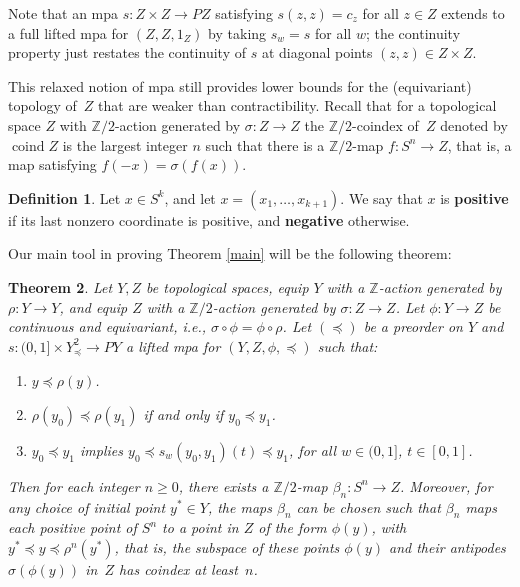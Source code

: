 \documentclass[11pt, reqno, english]{amsart}
\theoremstyle{plain}
\newtheorem{theorem}{Theorem}[section]
\theoremstyle{definition}
\newtheorem{definition}[theorem]{Definition}
\newcommand{\Z}{\mathbb{Z}}
\DeclareMathOperator{\coind}{\mathrm{coind}}
\begin{document}
Note that an mpa $s\colon Z \times Z \rightarrow PZ$ satisfying $s(z, z) =
c_{z}$ for all $z \in Z$ extends to a full lifted mpa for $(Z, Z, 1_{Z})$ by
taking $s_{w} = s$ for all $w$; the continuity property just restates the
continuity of $s$ at diagonal points $(z, z) \in Z \times Z$.

This relaxed notion of mpa still provides lower bounds for the (equivariant)
topology of~$Z$ that are weaker than contractibility. Recall that for a topological
space $Z$ with $\Z/2$-action generated by $\sigma \colon Z \to Z$ the 
$\Z/2$-coindex of~$Z$ denoted by $\coind Z$ is the largest integer $n$ such that
there is a $\Z/2$-map $f\colon S^n \to Z$, that is, a map satisfying $f(-x) = \sigma(f(x))$.

\begin{definition}
  Let $x \in S^{k}$, and let $x = (x_{1}, \ldots , x_{k+1})$. We say that $x$
  is \textbf{positive} if its last nonzero coordinate is positive, and
  \textbf{negative} otherwise.
\end{definition}

Our main tool in proving Theorem \ref{main} will be the following theorem: 

\begin{theorem}\label{mpa}
  Let $Y, Z$ be topological spaces, equip $Y$ with a $\Z$-action generated by
  $\rho\colon Y \rightarrow Y$, and equip $Z$ with a $\Z/2$-action generated
  by $\sigma\colon Z \rightarrow Z$. Let $\phi\colon Y \rightarrow Z$ be
  continuous  
  and equivariant, i.e., $\sigma\circ\phi =  \phi\circ\rho$.
  Let $(\preceq)$ be a preorder on $Y$ and $s\colon
  (0, 1] \times Y^{2}_{\preceq} \rightarrow PY$ a lifted mpa for $(Y, Z, \phi,
  \preceq)$ such that:
  \begin{enumerate}[(1)]
    \item $y \preceq \rho(y)$.
    \item $\rho(y_{0}) \preceq \rho(y_{1})$ if and only if $y_{0} \preceq y_{1}$.
    \item $y_{0} \preceq y_{1}$ implies $y_{0} \preceq s_{w}(y_{0},
    y_{1})(t) \preceq y_{1}$, for all $w \in (0, 1]$, $t \in [0, 1]$.
  \end{enumerate}
  Then for each integer $n\ge 0$, there exists a $\Z/{2}$-map $\beta_{n}\colon
  S^{n} \rightarrow Z$. %
  Moreover, for any choice of
  initial point $y^{*} \in Y$, the maps $\beta_{n}$ can be chosen such that
  $\beta_{n}$ maps each positive point of $S^{n}$ to a point in $Z$ of the form
  $\phi(y)$, with $y^{*} \preceq y \preceq \rho^{n}(y^{*})$, that is, the subspace of these points $\phi(y)$ and their antipodes $\sigma(\phi(y))$ in~$Z$ has coindex at least~$n$.
\end{theorem}
\end{document}
